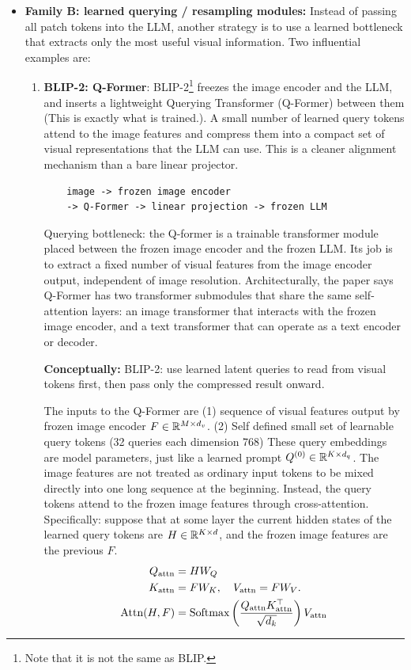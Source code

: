 \documentclass[11pt]{article}  %
\begin{document}
\begin{itemize}
  \item \textbf{Family B: learned querying / resampling modules:} Instead of passing all patch tokens into the LLM, another strategy is to use a learned bottleneck that extracts only the most useful visual information.
  Two influential examples are:
  \begin{enumerate}
    \item \textbf{BLIP-2: Q-Former}: BLIP-2\footnote{Note that it is not the same as BLIP.} freezes the image encoder and the LLM, and inserts a lightweight Querying Transformer (Q-Former) between them (This is exactly what is trained.). 
    A small number of learned query tokens attend to the image features and compress them into a compact set of visual representations that the LLM can use. 
    This is a cleaner alignment mechanism than a bare linear projector.

    \begin{verbatim}
    image -> frozen image encoder 
    -> Q-Former -> linear projection -> frozen LLM
    \end{verbatim}

    Querying bottleneck: the Q-former is a trainable transformer module placed between the frozen image encoder and the frozen LLM. Its job is to extract a fixed number of visual features from the image encoder output, independent of image resolution.
    Architecturally, the paper says Q-Former has two transformer submodules that share the same self-attention layers: an image transformer that interacts with the frozen image encoder, and a text transformer that can operate as a text encoder or decoder.

    \textbf{Conceptually:} BLIP-2: use learned latent queries to read from visual tokens first, then pass only the compressed result onward.

    The inputs to the Q-Former are (1) sequence of visual features output by frozen image encoder $F \in \mathbb{R}^{M \times d_v}$. 
    (2) Self defined small set of learnable query tokens (32 queries each dimension 768) These query embeddings are model parameters, just like a learned prompt $Q^{(0)} \in \mathbb{R}^{K \times d_q}$.
    The image features are not treated as ordinary input tokens to be mixed directly into one long sequence at the beginning. Instead, the query tokens attend to the frozen image features through cross-attention.
    Specifically: suppose that at some layer the current hidden states of the learned query tokens are $H \in \mathbb{R}^{K \times d}$, and the frozen image features are the previous $F$.
    \begin{align*}
      Q_{\text{attn}} &= H W_{Q} \\
      K_{\text{attn}} &= F W_{K}, \quad V_{\text{attn}} = F W_{V}. \\ 
      \text{Attn}(H, F) &= \text{Softmax}\left( \frac{Q_{\text{attn}}K^{\top}_{\text{attn}}}{\sqrt{d_k}} \right)V_{\text{attn}}
    \end{align*}


\end{enumerate}
\end{itemize}
\end{document}

